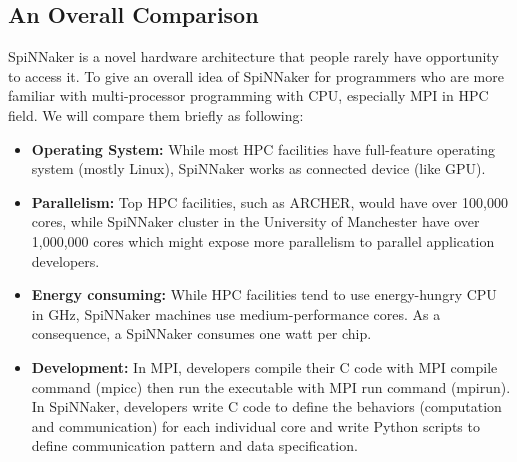 

\subsection{An Overall Comparison} \label{sec:sb}
SpiNNaker is a novel hardware architecture that people rarely have opportunity to access it. To give an overall idea of SpiNNaker for programmers who are more familiar with multi-processor programming with CPU, especially MPI in HPC field. We will compare them briefly as following:\\

\begin{itemize}
    \item \textbf{Operating System:} While most HPC facilities have full-feature operating system (mostly Linux), SpiNNaker works as connected device (like GPU). 
    
    \item \textbf{Parallelism:} Top HPC facilities, such as ARCHER, would have over 100,000 cores, while SpiNNaker cluster in the University of Manchester have over 1,000,000 cores which might expose more parallelism to parallel application developers.
    
    \item \textbf{Energy consuming:} While HPC facilities tend to use energy-hungry CPU in GHz, SpiNNaker machines use medium-performance cores. As a consequence, a SpiNNaker consumes one watt per chip.
    
    \item \textbf{Development:} In MPI, developers compile their C code with MPI compile command (mpicc) then run the executable with MPI run  command (mpirun). In SpiNNaker, developers write C code to define the behaviors (computation and communication) for each individual core and write Python scripts to define communication pattern and data specification.
\end{itemize}


